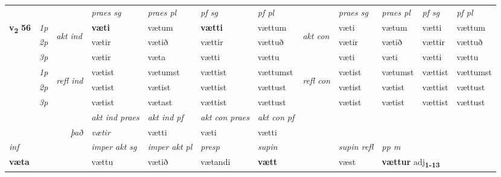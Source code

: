 \begin{longtable}[l]{X>{\footnotesize\itshape}llXXXXlXXXX}
\midrule

 & &   & \textit{praes sg}  & \textit{praes pl}    & \textit{ pf sg} & \textit{pf pl} & & \textit{praes sg}  & \textit{praes pl}    & \textit{pf sg} & \textit{pf pl }  \\ \cmidrule{4-7} \cmidrule{9-12}
 \multirow{2}{*}{{{\textbf{v{\textsubscript{2}}} \Large{\textbf{56}}}}}  & 1p & \multirow{3}{*}{\begin{turn}{90}\textit{akt ind}\end{turn}} & \textbf{væti} & vætum & \textbf{vætti} & vættum & \multirow{3}{*}{\begin{turn}{90}\textit{akt con}\end{turn}} &væti & vætum & vætti & vættum\\*
 & 2p &  &  vætir  & vætið & vættir & vættuð & & vætir & vætið & vættir & vættuð \\*
 & 3p &  & vætir & væta & vætti & vættu & & væti & væti& vætti & vættu \\*
\cmidrule{4-7} \cmidrule{9-12}
 & 1p & \multirow{3}{*}{\begin{turn}{90}\textit{refl ind}\end{turn}}  & vætist & vætumst & vættist & vættumst & \multirow{3}{*}{\begin{turn}{90}\textit{refl con}\end{turn}}  &vætist & vætumst & vættist & vættumst \\*
 & 2p &  & vætist & vætist & vættist & vættust & &vætist & vætist & vættist & vættust \\*
 & 3p  & & vætist & vætast & vættist & vættust & & vætist & vætist& vættist & vættust \\*
\cmidrule{4-7} \cmidrule{9-12}

   && &  \textit{akt ind praes} & \textit{akt ind pf} & \textit{akt con praes} & \textit{akt con pf} \\*
\multicolumn{3}{r}{\textit{það}} & vætir & vætti & væti & vætti \\*

\cmidrule{4-7}
   {\textit{inf}} & &  & \textit{imper akt sg} & \textit{imper akt pl}   & \textit{presp} & \textit{supin} && \textit{supin refl} & \textit{pp m} \\*
  {\textbf{væta}} & && vættu  & vætið   & vætandi &  \textbf{vætt} && væst & \multicolumn{2}{l}{\textbf{vættur} adj\textbf{\textsubscript{1-13}}} \\*

\midrule


\end{longtable}
